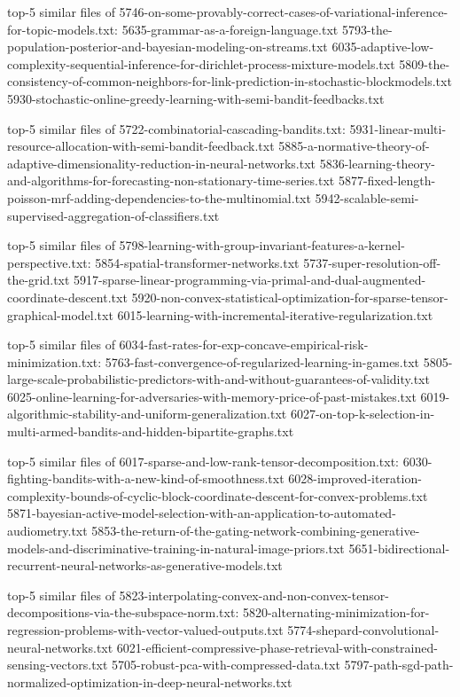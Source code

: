 \documentclass[11pt]{article}
\begin{document}
top-5 similar files of
5746-on-some-provably-correct-cases-of-variational-inference-for-topic-models.txt:
5635-grammar-as-a-foreign-language.txt
5793-the-population-posterior-and-bayesian-modeling-on-streams.txt
6035-adaptive-low-complexity-sequential-inference-for-dirichlet-process-mixture-models.txt
5809-the-consistency-of-common-neighbors-for-link-prediction-in-stochastic-blockmodels.txt
5930-stochastic-online-greedy-learning-with-semi-bandit-feedbacks.txt

top-5 similar files of 5722-combinatorial-cascading-bandits.txt:
5931-linear-multi-resource-allocation-with-semi-bandit-feedback.txt
5885-a-normative-theory-of-adaptive-dimensionality-reduction-in-neural-networks.txt
5836-learning-theory-and-algorithms-for-forecasting-non-stationary-time-series.txt
5877-fixed-length-poisson-mrf-adding-dependencies-to-the-multinomial.txt
5942-scalable-semi-supervised-aggregation-of-classifiers.txt

top-5 similar files of
5798-learning-with-group-invariant-features-a-kernel-perspective.txt:
5854-spatial-transformer-networks.txt
5737-super-resolution-off-the-grid.txt
5917-sparse-linear-programming-via-primal-and-dual-augmented-coordinate-descent.txt
5920-non-convex-statistical-optimization-for-sparse-tensor-graphical-model.txt
6015-learning-with-incremental-iterative-regularization.txt

top-5 similar files of
6034-fast-rates-for-exp-concave-empirical-risk-minimization.txt:
5763-fast-convergence-of-regularized-learning-in-games.txt
5805-large-scale-probabilistic-predictors-with-and-without-guarantees-of-validity.txt
6025-online-learning-for-adversaries-with-memory-price-of-past-mistakes.txt
6019-algorithmic-stability-and-uniform-generalization.txt
6027-on-top-k-selection-in-multi-armed-bandits-and-hidden-bipartite-graphs.txt

top-5 similar files of
6017-sparse-and-low-rank-tensor-decomposition.txt:
6030-fighting-bandits-with-a-new-kind-of-smoothness.txt
6028-improved-iteration-complexity-bounds-of-cyclic-block-coordinate-descent-for-convex-problems.txt
5871-bayesian-active-model-selection-with-an-application-to-automated-audiometry.txt
5853-the-return-of-the-gating-network-combining-generative-models-and-discriminative-training-in-natural-image-priors.txt
5651-bidirectional-recurrent-neural-networks-as-generative-models.txt

top-5 similar files of
5823-interpolating-convex-and-non-convex-tensor-decompositions-via-the-subspace-norm.txt:
5820-alternating-minimization-for-regression-problems-with-vector-valued-outputs.txt
5774-shepard-convolutional-neural-networks.txt
6021-efficient-compressive-phase-retrieval-with-constrained-sensing-vectors.txt
5705-robust-pca-with-compressed-data.txt
5797-path-sgd-path-normalized-optimization-in-deep-neural-networks.txt
\end{document}
